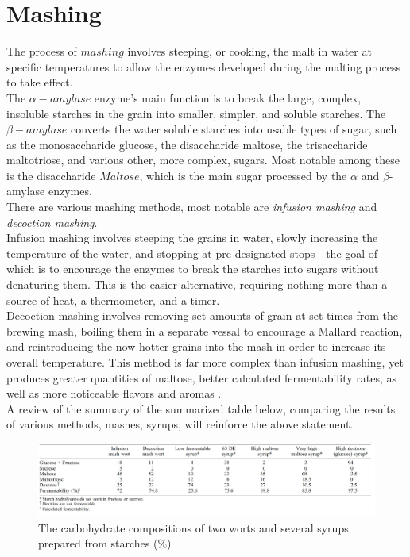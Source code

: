 \documentclass[twoside]{ctuthesis}
\theoremstyle{plain}
\theoremstyle{definition}
\theoremstyle{note}
\begin{document}
\section{Mashing}
The process of $mashing$ involves steeping, or cooking, the malt in water at specific temperatures to allow the enzymes developed during the malting process to take effect.\\
The $\alpha-amylase$ enzyme's main function is to break the large, complex, insoluble starches in the grain into smaller, simpler, and soluble starches. The $\beta-amylase$ converts the water soluble starches into usable types of sugar, such as the monosaccharide glucose, the disaccharide maltose, the trisaccharide maltotriose, and various other, more complex, sugars. Most notable among these is the disaccharide $Maltose$, which is the main sugar processed by the $\alpha$ and $\beta$-amylase enzymes.\\
There are various mashing methods, most notable are \textit{infusion mashing} and \textit{decoction mashing}.\\
Infusion mashing involves steeping the grains in water, slowly increasing the temperature of the water, and stopping at pre-designated stops - the goal of which is to encourage the enzymes to break the starches into sugars without denaturing them. This is the easier alternative, requiring nothing more than a source of heat, a thermometer, and a timer. \\
Decoction mashing involves removing set amounts of grain at set times from the brewing mash, boiling them in a separate vessal to encourage a Mallard reaction, and reintroducing the now hotter grains into the mash in order to increase its overall temperature. This method is far more complex than infusion mashing, yet produces greater quantities of maltose, better calculated fermentability rates, as well as more noticeable flavors and aromas \cite{Brewing_Science}.\\
A review of the summary of the summarized table below, comparing the results of various methods, mashes, syrups, will reinforce the above statement.

\begin{figure}[H]
	\centering
	\includegraphics[width = \textwidth]{MashingTable}
\begin{table}[H]
	\caption{The carbohydrate compositions of two worts and several syrups prepared from starches ($\%$)\cite{Brewing_Science}}
\end{table}
\end{figure}
\end{document}
